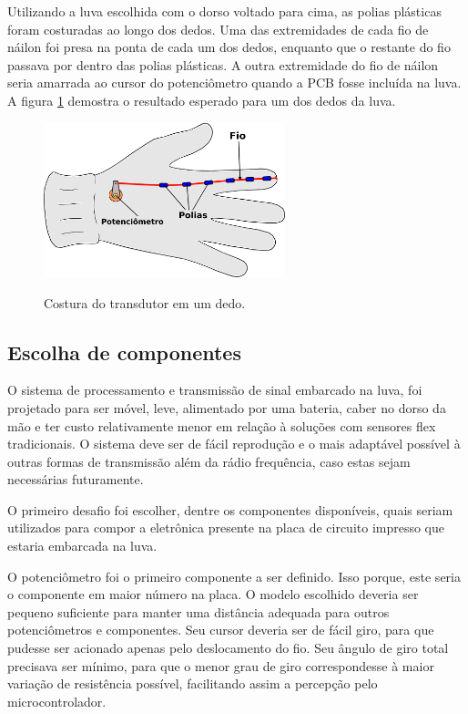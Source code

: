 \documentclass[
	12pt,				%
	openright,			%
	oneside,			%
	a4paper,			%
	english,			%
	brazil				%
	]{abntex2}
\begin{document}
		Utilizando a luva escolhida com o dorso voltado para cima, as polias plásticas foram costuradas ao longo dos dedos. Uma das extremidades de cada fio de náilon foi presa na ponta de cada um dos dedos, enquanto que o restante do fio passava por dentro das polias plásticas. A outra extremidade do fio de náilon seria amarrada ao cursor do potenciômetro quando a PCB fosse incluída na luva. A figura \ref{Fig:glove-wire-pot1} demostra o resultado esperado para um dos dedos da luva.


		\begin{figure}[h!]
			\centering
			\caption{Costura do transdutor em um dedo.}
  		\includegraphics[width=7cm]{./figures/glove-wire-pot1.png}
  		\label{Fig:glove-wire-pot1}
		\end{figure}

			
			\subsection{Escolha de componentes}	

			O sistema de processamento e transmissão de sinal embarcado na luva, foi projetado para ser móvel, leve, alimentado por uma bateria, caber no dorso da mão e ter custo relativamente menor em relação à soluções com sensores flex tradicionais. O sistema deve ser de fácil reprodução e o mais adaptável possível à outras formas de transmissão além da rádio frequência, caso estas sejam necessárias futuramente.

			O primeiro desafio foi escolher, dentre os componentes disponíveis, quais seriam utilizados para compor a eletrônica presente na placa de circuito impresso que estaria embarcada na luva.

			O potenciômetro foi o primeiro componente a ser definido. Isso porque, este seria o componente  em maior número na placa. O modelo escolhido deveria ser pequeno suficiente para manter uma distância adequada para outros potenciômetros e componentes. Seu cursor deveria ser de fácil giro, para que pudesse ser acionado apenas pelo deslocamento do fio. Seu ângulo de giro total precisava ser mínimo, para que o menor grau de giro correspondesse à maior variação de resistência possível, facilitando assim a percepção pelo microcontrolador.
\end{document}
